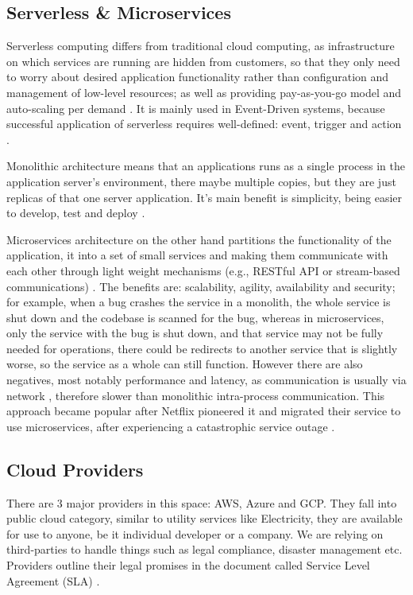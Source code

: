 \subsection{Serverless \& Microservices}
Serverless computing differs from traditional cloud computing, as infrastructure on which services are running are hidden from customers, so that they only need to worry about desired application functionality rather than configuration and management of low-level resources; as well as providing pay-as-you-go model and auto-scaling per demand \cite{serverless1}.  It is mainly used in Event-Driven systems, because successful application of serverless requires well-defined: event, trigger and action \cite{MALAWSKI2020502, serverless2}. 

Monolithic architecture means that an applications runs as a single process in the application server's environment, there maybe multiple copies, but they are just replicas of that one server application. It's main benefit is simplicity, being easier to develop, test and deploy \cite{monolith}.

Microservices architecture on the other hand partitions the functionality of the application, it into a set of small services and making them communicate with each other through light weight mechanisms (e.g., RESTful API or stream-based communications) \cite{fowler2014eb}. The benefits are: scalability, agility, availability and security; for example, when a bug crashes the service in a monolith, the whole service is shut down and the codebase is scanned for the bug, whereas in microservices, only the service with the bug is shut down, and that service may not be fully needed for operations, there could be redirects to another service that is slightly worse, so the service as a whole can still function. However there are also negatives, most notably performance and latency, as communication is usually via network \cite{Li2021Understanding}, therefore slower than monolithic intra-process communication. This approach became popular after Netflix pioneered it and migrated their service to use microservices, after experiencing a catastrophic service outage \cite{monolith}.
\subsection{Cloud Providers}
There are 3 major providers in this space: AWS, Azure and GCP. They fall into public cloud category, similar to utility services like Electricity, they are available for use to anyone, be it individual developer or a company. We are relying on third-parties to handle things such as legal compliance, disaster management etc. Providers outline their legal promises in the document called Service Level Agreement (SLA) \cite{cloudSLA}.

